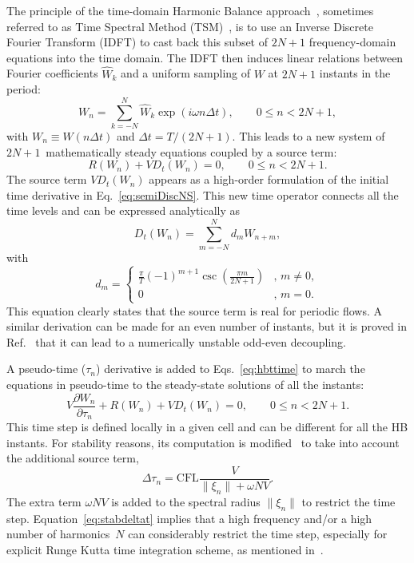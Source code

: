The principle of the time-domain Harmonic Balance
approach~\cite{Hall2002}, sometimes referred to as Time Spectral
Method (TSM)~\cite{Gopinath2005, Sicot2008}, is to use an Inverse
Discrete Fourier Transform (IDFT) to cast back this subset of $2N+1$
frequency-domain equations into the time domain.  The IDFT then
induces linear relations between Fourier coefficients $\widehat{W}_k$
and a uniform sampling of $W$ at $2N+1$ instants in the period:
\begin{equation}
  W_n=\sum_{k=-N}^N\widehat{W}_k\exp(i\omega n\Delta t),\quad \quad 0 \leq n < 2N+1,
  \label{eq:hb_concatenation}
\end{equation}
with $W_n \equiv W(n \Delta t)$ and $\Delta t=T/(2N+1)$. This leads to
a new system of $2N+1$~mathematically steady equations coupled by a
source term:
\begin{equation}
  \label{eq:hbttime}
  R(W_n)+VD_t(W_n)=0, \quad \quad 0 \leq n < 2N+1.
\end{equation}
The source term $VD_t(W_n)$ appears as a high-order formulation of the
initial time derivative in Eq.~\eqref{eq:semiDiscNS}. This new time
operator connects all the time levels and can be expressed
analytically as
\begin{equation}
\label{eq:dt}
  D_t(W_n)=\sum_{m=-N}^{N} d_m W_{n+m},
\end{equation}
with
\begin{equation}
  d_m=
  \begin{cases}
    \frac{\pi}{T}(-1)^{m+1}\csc\left(\frac{\pi
        m}{2N+1}\right) &, \, m\neq 0,\\
    0 &, \, m=0.
  \end{cases}
\end{equation}
This equation clearly states that the source term is real for periodic flows.
A similar derivation can be made for an even number of instants, but
it is proved in Ref.~\cite{Weide2005} that it can lead to a numerically unstable odd-even
decoupling.

A pseudo-time ($\tau_n$) derivative is added to
Eqs.~\eqref{eq:hbttime} to march the equations in pseudo-time to the
steady-state solutions of all the instants:
\begin{equation}
  \label{eq:pseudohbttime}
  V\frac{\partial W_n}{\partial\tau_n} + R(W_n)+VD_t(W_n)=0, \quad \quad
  0 \leq n < 2N+1.
\end{equation}
This time step is defined locally in a given cell and can
  be different for all the HB instants. For stability reasons, its
computation is modified~\cite{Weide2005} to take into account
the additional source term,
\begin{equation}
  \label{eq:stabdeltat}
  \Delta\tau_n=\text{CFL}\frac{V}{\|\xi_n\|+\omega NV}.
\end{equation}
The extra term $\omega NV$ is added to the spectral radius $\|\xi_n\|$ to
restrict the time step.  Equation~\eqref{eq:stabdeltat} implies that a
high frequency and/or a high number of harmonics~$N$ can considerably
restrict the time step, especially for explicit Runge Kutta time
integration scheme, as mentioned in~\cite{Hall2002}.

